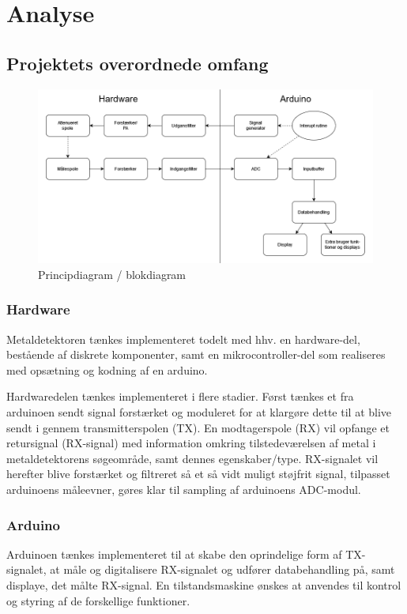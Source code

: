 \documentclass[../main.tex]{subfiles}
\begin{document}
\chapter{Analyse} \label{Chap:Analyse}

\section{Projektets overordnede omfang}

    \begin{figure}[H]
      \includegraphics[width=\textwidth]{Overleaf/Pictures/Diagrammer/Overordnet projektdiagram 1.png}
     \caption{Principdiagram / blokdiagram}
     \label{fig: Principdiagram/blokdiagram}
     \end{figure}

\subsection{Hardware}
Metaldetektoren tænkes implementeret todelt med hhv. en hardware-del, bestående af diskrete komponenter, samt en mikrocontroller-del som realiseres med opsætning og kodning af en arduino.\par
Hardwaredelen tænkes implementeret i flere stadier. Først tænkes et fra arduinoen sendt signal forstærket og moduleret for at klargøre dette til at blive sendt i gennem transmitterspolen (TX).
En modtagerspole (RX) vil opfange et retursignal (RX-signal) med information omkring tilstedeværelsen af metal i metaldetektorens søgeområde, samt dennes egenskaber/type.
RX-signalet vil herefter blive forstærket og filtreret så et så vidt muligt støjfrit signal, tilpasset arduinoens måleevner, gøres klar til sampling af arduinoens ADC-modul.
\newpage
\subsection{Arduino}
Arduinoen tænkes implementeret til at skabe den oprindelige form af TX-signalet, at måle og digitalisere RX-signalet og udfører databehandling på, samt displaye, det målte RX-signal.
En tilstandsmaskine ønskes at anvendes til kontrol og styring af de forskellige funktioner.
\end{document}
